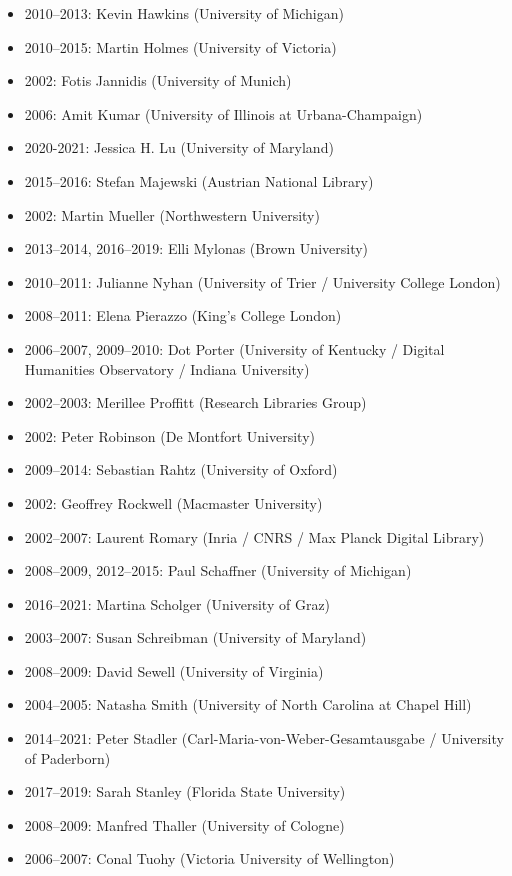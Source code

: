 \begin{itemize}
\item 2010–2013: Kevin Hawkins (University of Michigan)
\item 2010–2015: Martin Holmes (University of Victoria)
\item 2002: Fotis Jannidis (University of Munich) 
\item 2006: Amit Kumar (University of Illinois at Urbana-Champaign)
\item 2020-2021: Jessica H. Lu (University of Maryland)
\item 2015–2016: Stefan Majewski (Austrian National Library)
\item 2002: Martin Mueller (Northwestern University)
\item 2013–2014, 2016–2019: Elli Mylonas (Brown University)
\item 2010–2011: Julianne Nyhan (University of Trier / University College London)
\item 2008–2011: Elena Pierazzo (King's College London)
\item 2006–2007, 2009–2010: Dot Porter (University of Kentucky / Digital Humanities Observatory / Indiana University)
\item 2002–2003: Merillee Proffitt (Research Libraries Group)
\item 2002: Peter Robinson (De Montfort University)
\item 2009–2014: Sebastian Rahtz (University of Oxford)
\item 2002: Geoffrey Rockwell (Macmaster University)
\item 2002–2007: Laurent Romary (Inria / CNRS / Max Planck Digital Library)
\item 2008–2009, 2012–2015: Paul Schaffner (University of Michigan)
\item 2016–2021: Martina Scholger (University of Graz)
\item 2003–2007: Susan Schreibman (University of Maryland)
\item 2008–2009: David Sewell (University of Virginia)
\item 2004–2005: Natasha Smith (University of North Carolina at Chapel Hill)
\item 2014–2021: Peter Stadler (Carl-Maria-von-Weber-Gesamtausgabe / University of Paderborn)
\item 2017–2019: Sarah Stanley (Florida State University)
\item 2008–2009: Manfred Thaller (University of Cologne)
\item 2006–2007: Conal Tuohy (Victoria University of Wellington)

\end{itemize}
